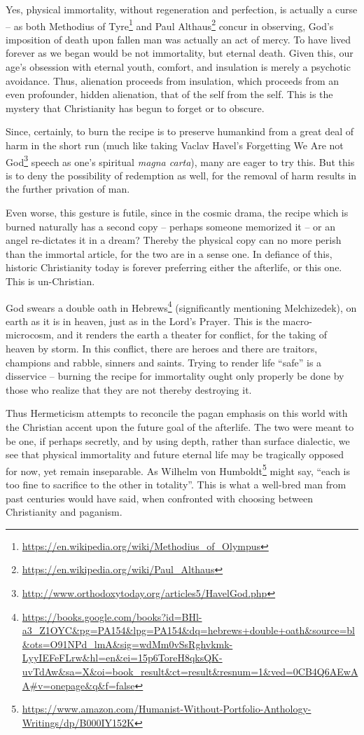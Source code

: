 Yes, physical immortality, without regeneration and perfection, is actually a curse -- as both Methodius of Tyre\footnote{\url{https://en.wikipedia.org/wiki/Methodius\_of\_Olympus}} and Paul Althaus\footnote{\url{https://en.wikipedia.org/wiki/Paul\_Althaus}} concur in observing, God's imposition of death upon fallen man was actually an act of mercy. To have lived forever as we began would be not immortality, but eternal death. Given this, our age's obsession with eternal youth, comfort, and insulation is merely a psychotic avoidance. Thus, alienation proceeds from insulation, which proceeds from an even profounder, hidden alienation, that of the self from the self. This is the mystery that Christianity has begun to forget or to obscure.

Since, certainly, to burn the recipe is to preserve humankind from a great deal of harm in the short run (much like taking Vaclav Havel's Forgetting We Are not God\footnote{\url{http://www.orthodoxytoday.org/articles5/HavelGod.php}} speech as one's spiritual \emph{magna carta}), many are eager to try this. But this is to deny the possibility of redemption as well, for the removal of harm results in the further privation of man.

Even worse, this gesture is futile, since in the cosmic drama, the recipe which is burned naturally has a second copy -- perhaps someone memorized it -- or an angel re-dictates it in a dream? Thereby the physical copy can no more perish than the immortal article, for the two are in a sense one. In defiance of this, historic Christianity today is forever preferring either the afterlife, or this one. This is un-Christian.

God swears a double oath in Hebrews\footnote{\url{https://books.google.com/books?id=BHl-a3\_Z1OYC\&pg=PA154\&lpg=PA154\&dq=hebrews+double+oath\&source=bl\&ots=O91NPd\_lmA\&sig=wdMm0vSsRghvkmk-LyyIEFeFLrw\&hl=en\&ei=15p6ToreH8qksQK-uvTdAw\&sa=X\&oi=book\_result\&ct=result\&resnum=1\&ved=0CB4Q6AEwAA\#v=onepage\&q\&f=false}} (significantly mentioning Melchizedek), on earth as it is in heaven, just as in the Lord's Prayer. This is the macro-microcosm, and it renders the earth a theater for conflict, for the taking of heaven by storm. In this conflict, there are heroes and there are traitors, champions and rabble, sinners and saints. Trying to render life ``safe'' is a disservice -- burning the recipe for immortality ought only properly be done by those who realize that they are not thereby destroying it.

Thus Hermeticism attempts to reconcile the pagan emphasis on this world with the Christian accent upon the future goal of the afterlife. The two were meant to be one, if perhaps secretly, and by using depth, rather than surface dialectic, we see that physical immortality and future eternal life may be tragically opposed for now, yet remain inseparable. As Wilhelm von Humboldt\footnote{\url{https://www.amazon.com/Humanist-Without-Portfolio-Anthology-Writings/dp/B000IY152K}} might say, ``each is too fine to sacrifice to the other in totality''. This is what a well-bred man from past centuries would have said, when confronted with choosing between Christianity and paganism.

